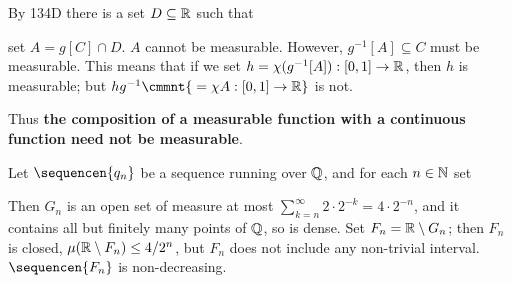  By 134D there is a set $D\subseteq\Bbb R$ such
that
     
     
\noindent set $A=g[C]\cap D$.    $A$ cannot be
measurable.
However, $g^{-1}[A]\subseteq C$ must be measurable.   This means that if we set
$h=\chi(g^{-1}[A]):[0,1]\to\Bbb R$, then $h$ is measurable;  but
$hg^{-1}\cmmnt{\mskip5mu =\chi A:[0,1]\to\Bbb R}$ is not.
     
Thus {\bf the composition of a measurable function with a continuous
function need not be measurable}.   
     
   Let $\sequencen{q_n}$ be a
sequence running over $\Bbb Q$, and for each $n\in\Bbb N$ set
     
     
     
\noindent Then $G_n$ is an open set of measure at most
$\sum_{k=n}^{\infty}2\cdot 2^{-k}=4\cdot 2^{-n}$, and it contains all
but finitely
many points of $\Bbb Q$, so is dense.   Set $F_n=\Bbb R\setminus G_n$;
then $F_n$ is closed,
$\mu(\Bbb R\setminus F_n)\le 4/2^n$, but $F_n$ does not include any non-trivial
interval.
$\sequencen{F_n}$ is non-decreasing.
     
